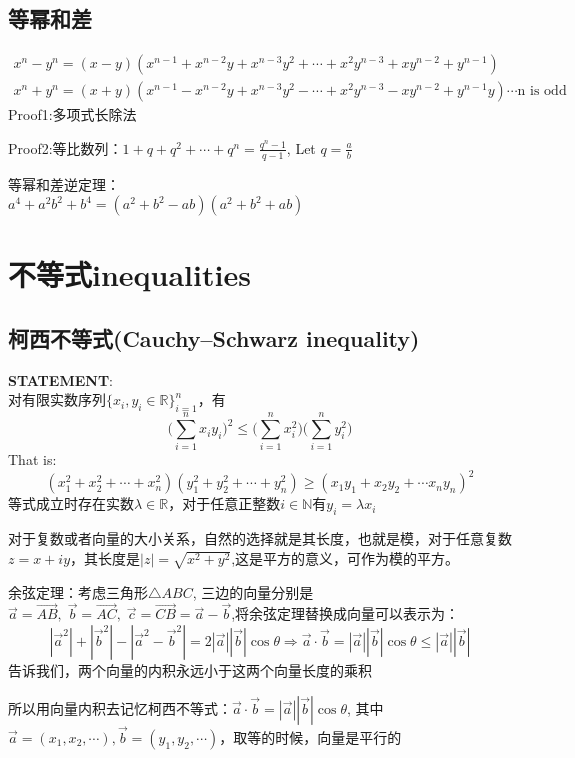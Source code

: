 \documentclass[../main.tex]{subfiles}
\begin{document}
\subsection{等幂和差}
\begin{gather*}
  x^n-y^n=(x-y)(x^{n-1}+x^{n-2}y+x^{n-3}y^2+\cdots + x^2y^{n-3}+xy^{n-2}+y^{n-1})\\
  x^n+y^n=(x+y)(x^{n-1}-x^{n-2}y+x^{n-3}y^2-\cdots +x^2y^{n-3}-xy^{n-2}+y^{n-1}y) \cdots \text{n is odd}
\end{gather*}
Proof1:多项式长除法

Proof2:等比数列：$1+q+q^2+\cdots +q^n=\frac{q^{n}-1}{q-1}$, Let $q=\frac{a}{b}$

等幂和差逆定理：\\
$a^4+a^2b^2+b^4=(a^2+b^2-ab)(a^2+b^2+ab)$

\newpage
\section{不等式inequalities}

\subsection{柯西不等式(Cauchy–Schwarz inequality)}
\begin{mdframed}
  \textbf{STATEMENT}:\\
  对有限实数序列$\{x_i, y_i\in \mathbb{R}\}_{i=1}^{n}$，有
  \[
   \big (\sum_{i=1}^nx_iy_i\big)^2 \le \big(\sum_{i=1}^nx_i^2\big)\big(\sum_{i=1}^ny_i^2\big)
  \]
  That is: \[(x_1^2+x_2^2+\cdots + x_n^2)(y_1^2+y_2^2+\cdots +y_n^2) \ge (x_1y_1+x_2y_2+\cdots x_ny_n)^2\]
  等式成立时存在实数$\lambda \in \mathbb{R}$，对于任意正整数$i\in \mathbb{N}$有$y_i=\lambda x_i$
\end{mdframed}
对于复数或者向量的大小关系，自然的选择就是其长度，也就是模，对于任意复数$z=x+iy$，其长度是$|z|=\sqrt{x^2+y^2}$,这是平方的意义，可作为模的平方。

余弦定理：考虑三角形$\triangle ABC$, 三边的向量分别是$\vec{a} = \vec{AB}, \; \vec{b} = \vec{AC}, \; \vec{c}=\vec{CB}=\vec{a}-\vec{b}$,将余弦定理替换成向量可以表示为：
\[
  |\vec{a}^2| + |\vec{b}^2| -|\vec{a}^2- \vec{b}^2| = 2|\vec{a}||\vec{b}|\cos \theta \Rightarrow \vec{a} \cdot \vec{b}=|\vec{a}||\vec{b}|\cos \theta \le |\vec{a}||\vec{b}|
\]
告诉我们，两个向量的内积永远小于这两个向量长度的乘积

所以用向量内积去记忆柯西不等式：$\vec{a} \cdot \vec{b} = |\vec{a}| |\vec{b}| \cos \theta$, 其中$\vec{a}=(x_1,x_2,\cdots), \vec{b}=(y_1,y_2,\cdots)$，取等的时候，向量是平行的
\end{document}
